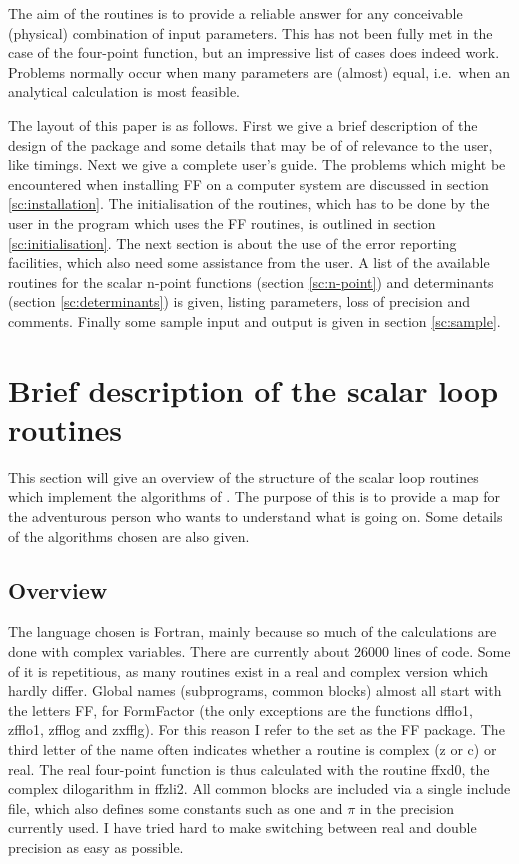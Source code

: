 The aim of the routines is to provide a reliable answer for any conceivable 
(physical) combination of input parameters.  This has not been fully met in 
the case of the four-point function, but an impressive list of cases does 
indeed work.  Problems normally occur when many parameters are (almost) 
equal, i.e.\ when an analytical calculation is most feasible.

The layout of this paper is as follows.  First we give a brief description of 
the design of the package and some details that may be of of relevance to the 
user, like timings.  Next we give a complete user's guide.  The problems which 
might be encountered when installing FF on a computer system are discussed in 
section \ref{sc:installation}.  The initialisation of the routines, which has 
to be done by the user in the program which uses the FF routines, is outlined 
in section \ref{sc:initialisation}.  The next section is about the use of the 
error reporting facilities, which also need some assistance from the user.  A 
list of the available routines for the scalar n-point functions (section 
\ref{sc:n-point}) and determinants (section \ref{sc:determinants}) is given, 
listing parameters, loss of precision and comments.
Finally some sample input and output is given in section \ref{sc:sample}.


\section{Brief description of the scalar loop routines}
\label{ap:FFdescription}

This section will give an overview of the structure of the scalar loop 
routines which implement the algorithms of \cite{NewAlgorithms}.  The purpose 
of this is to provide a map for the adventurous person who wants to understand 
what is going on.  Some details of the algorithms chosen are also given.

\subsection{Overview}

The language chosen is Fortran, mainly because so much of the calculations are 
done with complex variables.  There are currently about 26000 lines of 
code.  Some of it is repetitious, as many routines exist in a real and complex 
version which hardly differ.  Global names (subprograms, common blocks) almost 
all start with the letters {\comp FF}, for FormFactor (the only exceptions are 
the functions {\comp dfflo1}, {\comp zfflo1}, {\comp zfflog} and {\comp 
zxfflg}). For this reason I refer to the set as the FF package.  The third 
letter of the name often indicates whether a routine is complex ({\comp z} or 
{\comp c}) or real. The real four-point function is thus calculated with the 
routine {\comp ffxd0}, the complex dilogarithm in {\comp ffzli2}.  All common 
blocks are included via a single include file, which also defines some 
constants such as one and $\pi$ in the precision currently used.  I have tried 
hard to make switching between {\comp real} and {\comp double precision} as 
easy as possible.

